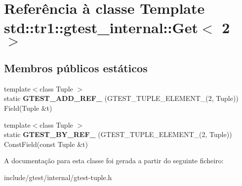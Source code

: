 \hypertarget{classstd_1_1tr1_1_1gtest__internal_1_1Get_3_012_01_4}{\section{Referência à classe Template std\-:\-:tr1\-:\-:gtest\-\_\-internal\-:\-:Get$<$ 2 $>$}
\label{classstd_1_1tr1_1_1gtest__internal_1_1Get_3_012_01_4}
}
\subsection*{Membros públicos estáticos}
\begin{DoxyCompactItemize}
\item 
\hypertarget{classstd_1_1tr1_1_1gtest__internal_1_1Get_3_012_01_4_a8dfe7b5c1c915f10181e3fb5952ba6d8}{{\footnotesize template$<$class Tuple $>$ }\\static {\bfseries G\-T\-E\-S\-T\-\_\-\-A\-D\-D\-\_\-\-R\-E\-F\-\_\-} (G\-T\-E\-S\-T\-\_\-\-T\-U\-P\-L\-E\-\_\-\-E\-L\-E\-M\-E\-N\-T\-\_\-(2, Tuple)) Field(Tuple \&t)}\label{classstd_1_1tr1_1_1gtest__internal_1_1Get_3_012_01_4_a8dfe7b5c1c915f10181e3fb5952ba6d8}

\item 
\hypertarget{classstd_1_1tr1_1_1gtest__internal_1_1Get_3_012_01_4_a76127c9c03c1f0caa61fb87d4d756b5b}{{\footnotesize template$<$class Tuple $>$ }\\static {\bfseries G\-T\-E\-S\-T\-\_\-\-B\-Y\-\_\-\-R\-E\-F\-\_\-} (G\-T\-E\-S\-T\-\_\-\-T\-U\-P\-L\-E\-\_\-\-E\-L\-E\-M\-E\-N\-T\-\_\-(2, Tuple)) Const\-Field(const Tuple \&t)}\label{classstd_1_1tr1_1_1gtest__internal_1_1Get_3_012_01_4_a76127c9c03c1f0caa61fb87d4d756b5b}

\end{DoxyCompactItemize}


A documentação para esta classe foi gerada a partir do seguinte ficheiro\-:\begin{DoxyCompactItemize}
\item 
include/gtest/internal/gtest-\/tuple.\-h\end{DoxyCompactItemize}
